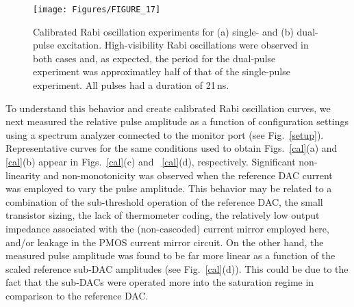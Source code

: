 \documentclass[journal]{IEEEtran}
\newcommand{\CR}[1]{{\color{black}#1}}
\begin{document}
\begin{figure}[bt!]
\texttt{[image: Figures/FIGURE\_17]}
\caption{\CR{Calibrated Rabi oscillation experiments for (a) single- and (b) dual-pulse excitation. High-visibility Rabi oscillations were observed in both cases and, as expected, the period for the dual-pulse experiment was approximatley half of that of the single-pulse experiment. All pulses had a duration of 21\,ns.}}\label{rabidual}
\end{figure}

\CR{To understand this behavior and create calibrated Rabi oscillation curves, we next measured the relative pulse amplitude as a function of configuration settings using a spectrum analyzer connected to the monitor port (see Fig.~\ref{setup}). Representative curves for the same conditions used to obtain Figs.~\ref{cal}(a) and \ref{cal}(b) appear in Figs.~\ref{cal}(c) and ~\ref{cal}(d), respectively. Significant non-linearity and non-monotonicity was observed when the reference DAC current was employed to vary the pulse amplitude. This behavior may be related to a combination of the sub-threshold operation of the reference DAC, the small transistor sizing, the lack of thermometer coding,  the relatively low output impedance associated with the (non-cascoded) current mirror employed here, and/or leakage in the PMOS current mirror circuit. On the other hand, the measured pulse amplitude was found to be far more linear as a function of the scaled reference sub-DAC amplitudes (see Fig.~\ref{cal}(d)). This could be due to the fact that the sub-DACs were operated more into the saturation regime in comparison to the reference DAC.}

\end{document}
